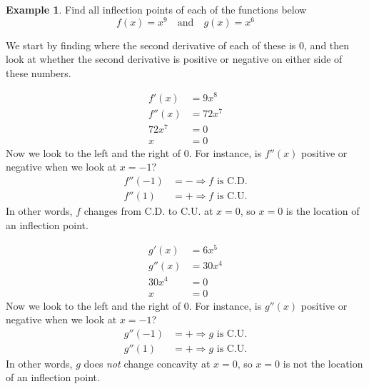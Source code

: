 \documentclass[oneside]{book}
\theoremstyle{definition}
\newtheorem{example}{Example}
\theoremstyle{solution}
\newtheorem*{solution}{Solution}
\newenvironment{solution}{\vspace{2in}\comment}{\endcomment}
\begin{document}
\begin{example}
Find all inflection points of each of the functions below
$$ 
f(x)  = x^9 \quad\text{and}\quad g(x) = x^6
$$
\end{example}

\begin{solution}
  We start by finding where the second derivative of each of these is
  $0$, and then look at whether the second derivative is positive or
  negative on either side of these numbers.

\begin{align*}
f'(x) & = 9x^8\\
f''(x) & = 72x^7\\
72 x^7 & = 0\\
x& = 0
\end{align*}
Now we look to the left and the right of $0$.  For instance, is
$f''(x)$ positive or negative when we look at $x=-1$?
\begin{align*}
f''(-1) & = - \Rightarrow f \text{ is C.D.}\\
f''(1) & = + \Rightarrow f \text{ is C.U.}
\end{align*}
In other words, $f$ changes from C.D. to C.U. at $x=0$, so $x=0$ is
the location of an inflection point.

\begin{align*}
g'(x) & = 6x^5\\
g''(x) & = 30x^4\\
30 x^4 & = 0\\
x& = 0
\end{align*}
Now we look to the left and the right of $0$.  For instance, is
$g''(x)$ positive or negative when we look at $x=-1$?
\begin{align*}
g''(-1) & = + \Rightarrow g \text{ is C.U.}\\
g''(1) & = + \Rightarrow g \text{ is C.U.}
\end{align*}
In other words, $g$ does \emph{not} change concavity at $x=0$, so
$x=0$ is not the location of an inflection point.
\end{solution}


% 
% 
\end{document}
